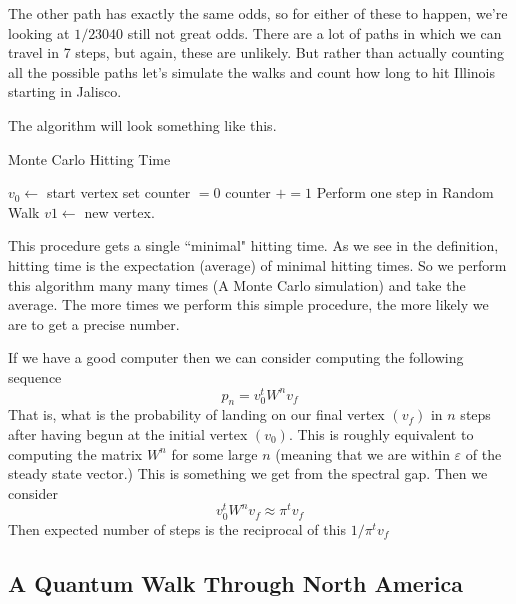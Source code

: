 \documentclass{article}
\theoremstyle{definition}
\theoremstyle{remark}
\begin{document}
The other path has exactly the same odds, so for either of these to happen, we're looking at $1/23040$ still not great odds.  There are a lot of paths in which we can travel in 7 steps, but again, these are unlikely.  But rather than actually counting all the possible paths let's simulate the walks and count how long to hit Illinois starting in Jalisco.

The algorithm will look something like this.

\begin{algorithm}
	\caption{Monte Carlo Hitting Time}
	\label{Estimate Hitting Time from Jalisco to Illinois.}
	\begin{algorithmic}[1]
		\State $v_0 \gets $ start vertex
		\State set counter $=0$ 
		\State counter $+= 1$
		\State Perform one step in Random Walk $v1 \gets $ new vertex.
		\EndWhile
		\EndProcedure
	\end{algorithmic}	
\end{algorithm}   


This procedure gets a single ``minimal" hitting time.  As we see in the definition, hitting time is the expectation (average) of minimal hitting times. So we perform this algorithm many many times (A Monte Carlo simulation) and take the average.  The more times we perform this simple procedure, the more likely we are to get a precise number.

If we have a good computer then we can consider computing the following sequence
\[
p_n = v^t_0 W^n v_f
\]
That is, what is the probability of landing on our final vertex $(v_f)$ in $n$ steps after having begun at the initial vertex $(v_0)$.  This is roughly equivalent to computing the matrix $W^n$ for some large $n$ (meaning that we are within $\varepsilon$ of the steady state vector.)  This is something we get from the spectral gap.  Then we consider
\[
v^t_0 W^n v_f \approx \pi^t v_f
\]
Then expected number of steps is the reciprocal of this $1/\pi^t v_f$




\subsection{A Quantum Walk Through North America}
\end{document}
